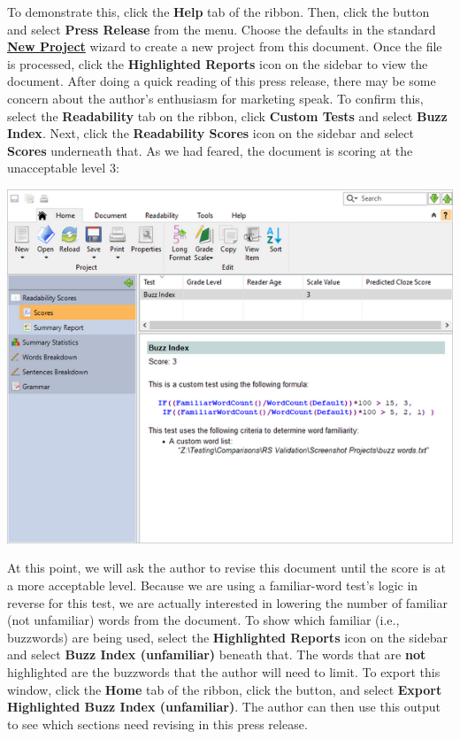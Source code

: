 \documentclass[
]{book}
\theoremstyle{definition}
\theoremstyle{definition}
\theoremstyle{definition}
\theoremstyle{definition}
\theoremstyle{remark}
\begin{document}
To demonstrate this, click the \textbf{Help} tab of the ribbon. Then, click the  button and select \textbf{Press Release} from the menu. Choose the defaults in the standard \protect\hyperlink{creating-standard-project}{\textbf{New Project}} wizard to create a new project from this document. Once the file is processed, click the \textbf{Highlighted Reports} icon on the sidebar to view the document. After doing a quick reading of this press release, there may be some concern about the author's enthusiasm for marketing speak. To confirm this, select the \textbf{Readability} tab on the ribbon, click \textbf{Custom Tests} and select \textbf{Buzz Index}. Next, click the \textbf{Readability Scores} icon on the sidebar and select \textbf{Scores} underneath that. As we had feared, the document is scoring at the unacceptable level 3:

\includegraphics{Images/CustomIndexTestExampleScore.png}

At this point, we will ask the author to revise this document until the score is at a more acceptable level. Because we are using a familiar-word test's logic in reverse for this test, we are actually interested in lowering the number of familiar (not unfamiliar) words from the document. To show which familiar (i.e., buzzwords) are being used, select the \textbf{Highlighted Reports} icon on the sidebar and select \textbf{Buzz Index (unfamiliar)} beneath that. The words that are \textbf{not} highlighted are the buzzwords that the author will need to limit. To export this window, click the \textbf{Home} tab of the ribbon, click the  button, and select \textbf{Export Highlighted Buzz Index (unfamiliar)}. The author can then use this output to see which sections need revising in this press release.
\end{document}
